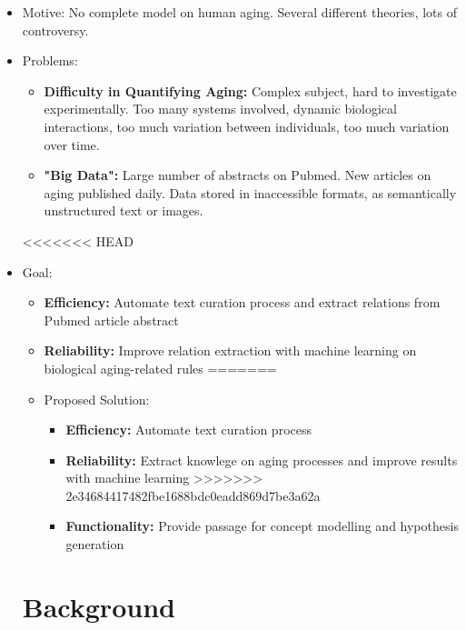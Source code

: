 \documentclass[11pt]{article}
\begin{document}
\begin{itemize}
\item Motive: No complete model on human aging. Several different theories, lots of controversy.
\item Problems:
	\begin{itemize}
		\item \textbf{Difficulty in Quantifying Aging:} Complex subject, hard to investigate experimentally. Too many systems involved, dynamic biological interactions, too much variation between individuals, too much variation over time.
		\item \textbf{"Big Data":} Large number of abstracts on Pubmed. New articles on aging published daily. Data stored in inaccessible formats, as semantically unstructured text or images. 
	\end{itemize}
<<<<<<< HEAD
\item Goal: 
	\begin{itemize}
		\item \textbf{Efficiency:} Automate text curation process and extract relations from Pubmed article abstract 
		\item \textbf{Reliability:} Improve relation extraction with machine learning on biological aging-related rules 
=======
\item Proposed Solution: 
	\begin{itemize}
		\item \textbf{Efficiency:} Automate text curation process
		\item \textbf{Reliability:} Extract knowlege on aging processes and improve results with machine learning
>>>>>>> 2e34684417482fbe1688bdc0eadd869d7be3a62a
		\item \textbf{Functionality:} Provide passage for concept modelling and hypothesis generation
	\end{itemize}
\end{itemize}

\section{Background}


\end{itemize}
\end{document}
